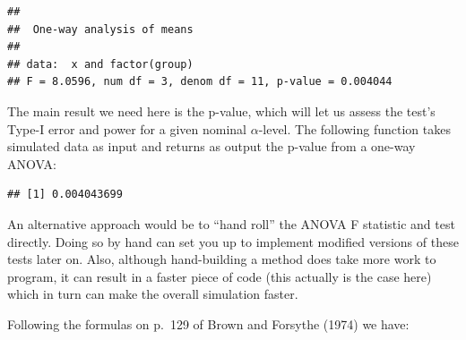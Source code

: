 \documentclass[
]{book}
\newenvironment{Shaded}{\begin{snugshade}}{\end{snugshade}}
\newcommand{\AttributeTok}[1]{\textcolor[rgb]{0.77,0.63,0.00}{#1}}
\newcommand{\ConstantTok}[1]{\textcolor[rgb]{0.00,0.00,0.00}{#1}}
\newcommand{\ControlFlowTok}[1]{\textcolor[rgb]{0.13,0.29,0.53}{\textbf{#1}}}
\newcommand{\FunctionTok}[1]{\textcolor[rgb]{0.00,0.00,0.00}{#1}}
\newcommand{\NormalTok}[1]{#1}
\newcommand{\OtherTok}[1]{\textcolor[rgb]{0.56,0.35,0.01}{#1}}
\newcommand{\SpecialCharTok}[1]{\textcolor[rgb]{0.00,0.00,0.00}{#1}}
\begin{document}
\begin{verbatim}
## 
##  One-way analysis of means
## 
## data:  x and factor(group)
## F = 8.0596, num df = 3, denom df = 11, p-value = 0.004044
\end{verbatim}

The main result we need here is the p-value, which will let us assess the test's Type-I error and power for a given nominal \(\alpha\)-level. The following function takes simulated data as input and returns as output the p-value from a one-way ANOVA:

\begin{Shaded}
\end{Shaded}

\begin{verbatim}
## [1] 0.004043699
\end{verbatim}

An alternative approach would be to ``hand roll'' the ANOVA F statistic and test directly.
Doing so by hand can set you up to implement modified versions of these tests later on.
Also, although hand-building a method does take more work to program, it can result in a faster piece of code (this actually is the case here) which in turn can make the overall simulation faster.

Following the formulas on p.~129 of Brown and Forsythe (1974) we have:
\end{document}
